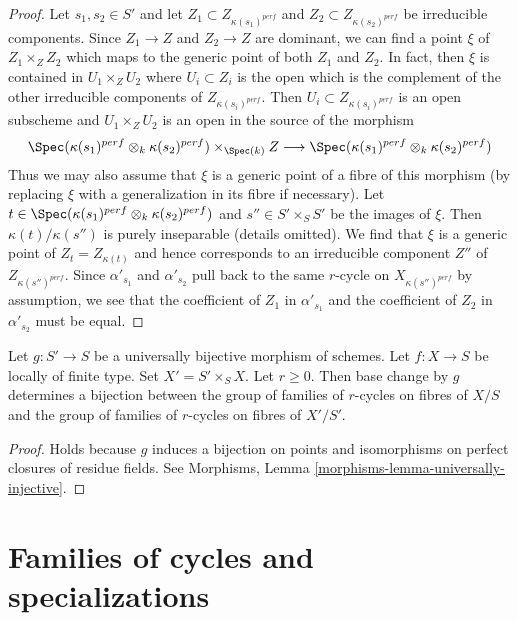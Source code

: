 \begin{proof}
\medskip\noindent
Let $s_1, s_2 \in S'$ and let $Z_1 \subset Z_{\kappa(s_1)^{perf}}$
and $Z_2 \subset Z_{\kappa(s_2)^{perf}}$ be irreducible components.
Since $Z_1 \to Z$ and $Z_2 \to Z$ are dominant, we can find a point
$\xi$ of $Z_1 \times_Z Z_2$ which maps to the generic point of both
$Z_1$ and $Z_2$. In fact, then $\xi$ is contained in $U_1 \times_Z U_2$
where $U_i \subset Z_i$ is the open which is the complement of the
other irreducible components of $Z_{\kappa(s_i)^{perf}}$. Then
$U_i \subset Z_{\kappa(s_i)^{perf}}$ is an open subscheme and
$U_1 \times_Z U_2$ is an open in the source of the morphism
$$
\Spec(\kappa(s_1)^{perf} \otimes_k \kappa(s_2)^{perf})
\times_{\Spec(k)} Z
\longrightarrow
\Spec(\kappa(s_1)^{perf} \otimes_k \kappa(s_2)^{perf})
$$
Thus we may also assume that $\xi$ is a generic point
of a fibre of this morphism (by replacing $\xi$ with a generalization
in its fibre if necessary). Let
$t \in \Spec(\kappa(s_1)^{perf} \otimes_k \kappa(s_2)^{perf})$
and $s'' \in S' \times_S S'$ be the images of $\xi$.
Then $\kappa(t)/\kappa(s'')$ is purely inseparable (details omitted).
We find that $\xi$ is a generic point of $Z_t = Z_{\kappa(t)}$
and hence corresponds to an irreducible component $Z''$
of $Z_{\kappa(s'')^{perf}}$.
Since $\alpha'_{s_1}$ and $\alpha'_{s_2}$ pull back to
the same $r$-cycle on $X_{\kappa(s'')^{perf}}$ by assumption, 
we see that the coefficient of
$Z_1$ in $\alpha'_{s_1}$ and the coefficient of $Z_2$
in $\alpha'_{s_2}$ must be equal.
\end{proof}

\begin{lemma}
\label{lemma-pullback-universally-bijective}
Let $g : S' \to S$ be a universally bijective morphism of schemes.
Let $f : X \to S$ be locally of finite type. Set $X' = S' \times_S X$.
Let $r \geq 0$. Then base change by $g$ determines a bijection
between the group of families of $r$-cycles on fibres of $X/S$ and
the group of families of $r$-cycles on fibres of $X'/S'$.
\end{lemma}

\begin{proof}
Holds because $g$ induces a bijection on points and isomorphisms
on perfect closures of residue fields. See Morphisms, Lemma
\ref{morphisms-lemma-universally-injective}.
\end{proof}







\section{Families of cycles and specializations}
\label{section-families-specialization}


